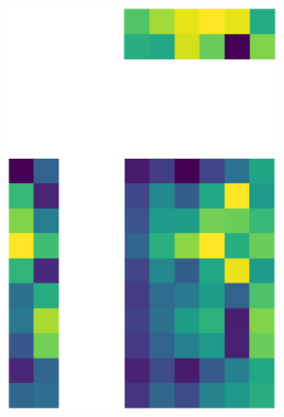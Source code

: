 \documentclass[10pt,twocolumn]{article}
\begin{document}
\begin{figure}[H]
\begin{subfigure}[t]{.15\textwidth}
\includegraphics[scale=.2]{DWGs/semi-structured-matrix-reconstruction-PCs-2.eps}
\caption{ }
\end{subfigure}
\begin{subfigure}[t]{.15\textwidth}
\centering

\end{subfigure}
\end{figure}
\end{document}
